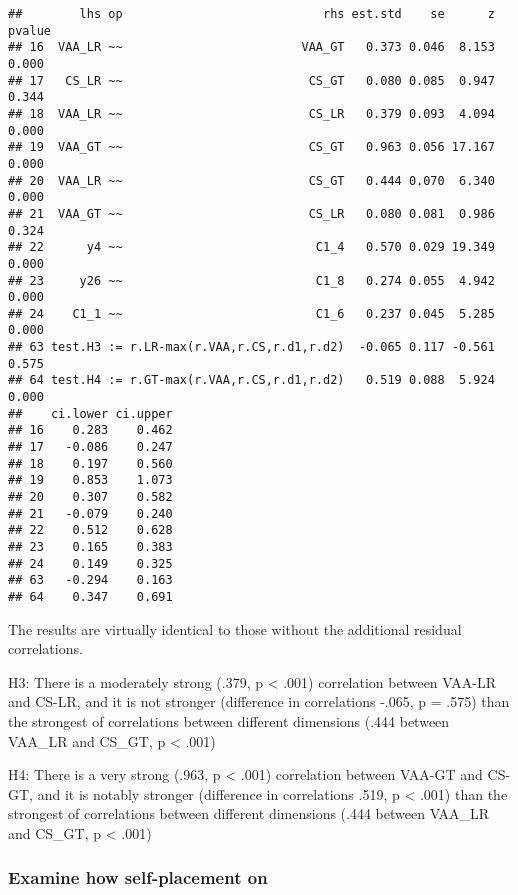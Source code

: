 \documentclass[
]{article}
\begin{document}
\begin{verbatim}
##        lhs op                            rhs est.std    se      z pvalue
## 16  VAA_LR ~~                         VAA_GT   0.373 0.046  8.153  0.000
## 17   CS_LR ~~                          CS_GT   0.080 0.085  0.947  0.344
## 18  VAA_LR ~~                          CS_LR   0.379 0.093  4.094  0.000
## 19  VAA_GT ~~                          CS_GT   0.963 0.056 17.167  0.000
## 20  VAA_LR ~~                          CS_GT   0.444 0.070  6.340  0.000
## 21  VAA_GT ~~                          CS_LR   0.080 0.081  0.986  0.324
## 22      y4 ~~                           C1_4   0.570 0.029 19.349  0.000
## 23     y26 ~~                           C1_8   0.274 0.055  4.942  0.000
## 24    C1_1 ~~                           C1_6   0.237 0.045  5.285  0.000
## 63 test.H3 := r.LR-max(r.VAA,r.CS,r.d1,r.d2)  -0.065 0.117 -0.561  0.575
## 64 test.H4 := r.GT-max(r.VAA,r.CS,r.d1,r.d2)   0.519 0.088  5.924  0.000
##    ci.lower ci.upper
## 16    0.283    0.462
## 17   -0.086    0.247
## 18    0.197    0.560
## 19    0.853    1.073
## 20    0.307    0.582
## 21   -0.079    0.240
## 22    0.512    0.628
## 23    0.165    0.383
## 24    0.149    0.325
## 63   -0.294    0.163
## 64    0.347    0.691
\end{verbatim}

The results are virtually identical to those without the additional
residual correlations.

H3: There is a moderately strong (.379, p \textless{} .001) correlation
between VAA-LR and CS-LR, and it is not stronger (difference in
correlations -.065, p = .575) than the strongest of correlations between
different dimensions (.444 between VAA\_LR and CS\_GT, p \textless{}
.001)

H4: There is a very strong (.963, p \textless{} .001) correlation
between VAA-GT and CS-GT, and it is notably stronger (difference in
correlations .519, p \textless{} .001) than the strongest of
correlations between different dimensions (.444 between VAA\_LR and
CS\_GT, p \textless{} .001)

\hypertarget{examine-how-self-placement-on}{%
\subsubsection{Examine how self-placement
on}\label{examine-how-self-placement-on}}
\end{document}
